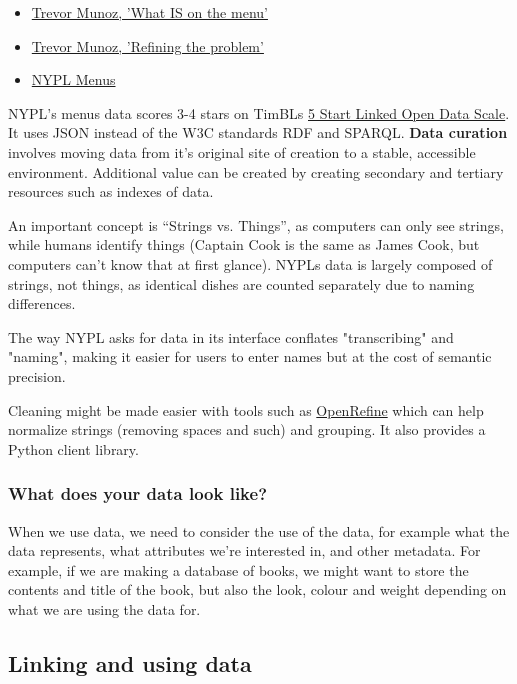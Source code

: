 \begin{itemize}
    \item \href{http://trevormunoz.com/notebook/2013/08/08/what-is-on-the-menu-more-work-with-nypl-open-data-part-one.html}{Trevor Munoz, 'What IS on the menu'}
    \item \href{http://trevormunoz.com/notebook/2013/08/19/refining-the-problem-more-work-with-nypl-open-data-part-two.html}{Trevor Munoz, 'Refining the problem'}
    \item \href{http://menus.nypl.org/menus}{NYPL Menus}
\end{itemize}

NYPL's menus data scores 3-4 stars on TimBLs \href{http://www.w3.org/DesignIssues/LinkedData.html}{5 Start Linked Open Data Scale}. It uses JSON instead of the W3C standards RDF and SPARQL. \textbf{Data curation} involves moving data from it's original site of creation to a stable, accessible environment. Additional value can be created by creating secondary and tertiary resources such as indexes of data.

An important concept is ``Strings vs. Things'', as computers can only see strings, while humans identify things (Captain Cook is the same as James Cook, but computers can't know that at first glance). NYPLs data is largely composed of strings, not things, as identical dishes are counted separately due to naming differences.

The way NYPL asks for data in its interface conflates "transcribing" and "naming", making it easier for users to enter names but at the cost of semantic precision.

Cleaning might be made easier with tools such as \href{https://openrefine.org/}{OpenRefine} which can help normalize strings (removing spaces and such) and grouping. It also provides a Python client library.

\subsubsection{What does your data look like?}

When we use data, we need to consider the use of the data, for example what the data represents, what attributes we're interested in, and other metadata. For example, if we are making a database of books, we might want to store the contents and title of the book, but also the look, colour and weight depending on what we are using the data for.

\subsection{Linking and using data}

